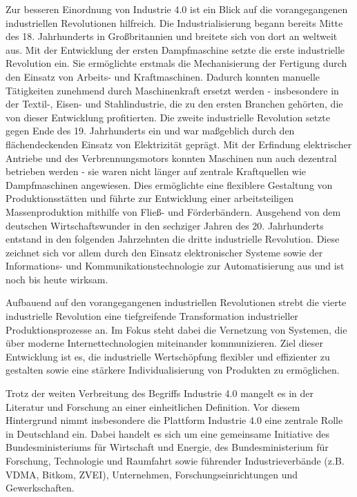 Zur besseren Einordnung von Industrie 4.0 ist ein Blick auf die vorangegangenen industriellen Revolutionen hilfreich.
Die Industrialisierung begann bereits Mitte des 18. Jahrhunderts in Großbritannien und breitete sich von dort an weltweit aus. 
Mit der Entwicklung der ersten Dampfmaschine setzte die erste industrielle Revolution ein. 
Sie ermöglichte erstmals die Mechanisierung der Fertigung durch den Einsatz von Arbeits- und Kraftmaschinen. 
Dadurch konnten manuelle Tätigkeiten zunehmend durch Maschinenkraft ersetzt werden - insbesondere in der Textil-, Eisen- und Stahlindustrie, die zu den ersten Branchen gehörten, die von dieser Entwicklung profitierten.
Die zweite industrielle Revolution setzte gegen Ende des 19. Jahrhunderts ein und war maßgeblich durch den flächendeckenden Einsatz von Elektrizität geprägt. 
Mit der Erfindung elektrischer Antriebe und des Verbrennungsmotors konnten Maschinen nun auch dezentral betrieben werden - sie waren nicht länger auf zentrale Kraftquellen wie Dampfmaschinen angewiesen. 
Dies ermöglichte eine flexiblere Gestaltung von Produktionsstätten und führte zur Entwicklung einer arbeitsteiligen Massenproduktion mithilfe von Fließ- und Förderbändern.
Ausgehend von dem deutschen Wirtschaftswunder in den sechziger Jahren des 20. Jahrhunderts entstand in den folgenden Jahrzehnten die dritte industrielle Revolution.
Diese zeichnet sich vor allem durch den Einsatz elektronischer Systeme sowie der Informations- und Kommunikationstechnologie zur Automatisierung aus und ist noch bis heute wirksam.

Aufbauend auf den vorangegangenen industriellen Revolutionen strebt die vierte industrielle Revolution eine tiefgreifende Transformation industrieller Produktionsprozesse an. 
Im Fokus steht dabei die Vernetzung von Systemen, die über moderne Internettechnologien miteinander kommunizieren.
Ziel dieser Entwicklung ist es, die industrielle Wertschöpfung flexibler und effizienter zu gestalten sowie eine stärkere Individualisierung von Produkten zu ermöglichen. 
\cite{Industrie4.0ProduktionAutomatisierung}\cite{EinführungundUmsetzungI4.0}

Trotz der weiten Verbreitung des Begriffs Industrie 4.0 mangelt es in der Literatur und Forschung an einer einheitlichen Definition.
Vor diesem Hintergrund nimmt insbesondere die Plattform Industrie 4.0 \cite{plattform_i40} eine zentrale Rolle in Deutschland ein. 
Dabei handelt es sich um eine gemeinsame Initiative des Bundesministeriums für Wirtschaft und Energie, des Bundesministerium für Forschung, Technologie und Raumfahrt sowie führender Industrieverbände (z.B. VDMA, Bitkom, ZVEI), Unternehmen, Forschungseinrichtungen und Gewerkschaften.

